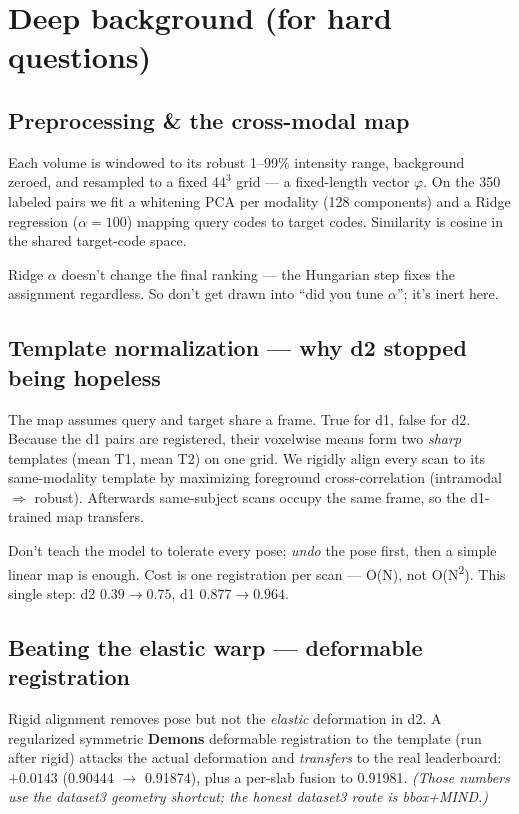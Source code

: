 \documentclass[12pt,a4paper]{article}
\begin{document}
\section{Deep background (for hard questions)}

\subsection{Preprocessing \& the cross-modal map}
Each volume is windowed to its robust 1--99\% intensity range, background zeroed, and
resampled to a fixed $44^3$ grid — a fixed-length vector $\varphi$. On the 350 labeled
pairs we fit a whitening PCA per modality (128 components) and a Ridge regression
($\alpha=100$) mapping query codes to target codes. Similarity is cosine in the shared
target-code space.
\begin{note}
Ridge $\alpha$ doesn't change the final ranking — the Hungarian step fixes the assignment
regardless. So don't get drawn into ``did you tune $\alpha$''; it's inert here.
\end{note}

\subsection{Template normalization — why d2 stopped being hopeless}
The map assumes query and target share a frame. True for d1, false for d2. Because the
d1 pairs are registered, their voxelwise means form two \emph{sharp} templates (mean T1,
mean T2) on one grid. We rigidly align every scan to its same-modality template by
maximizing foreground cross-correlation (intramodal $\Rightarrow$ robust). Afterwards
same-subject scans occupy the same frame, so the d1-trained map transfers.
\begin{mentalmodel}
Don't teach the model to tolerate every pose; \emph{undo} the pose first, then a simple
linear map is enough. Cost is one registration per scan — O(N), not O(N\textsuperscript{2}).
This single step: d2 $0.39\rightarrow0.75$, d1 $0.877\rightarrow0.964$.
\end{mentalmodel}

\subsection{Beating the elastic warp — deformable registration}
Rigid alignment removes pose but not the \emph{elastic} deformation in d2. A regularized
symmetric \textbf{Demons} deformable registration to the template (run after rigid) attacks
the actual deformation and \emph{transfers} to the real leaderboard: $+0.0143$
(0.90444 $\rightarrow$ 0.91874), plus a per-slab fusion to 0.91981. \emph{(Those numbers use
the dataset3 geometry shortcut; the honest dataset3 route is bbox+MIND.)}
\end{document}

